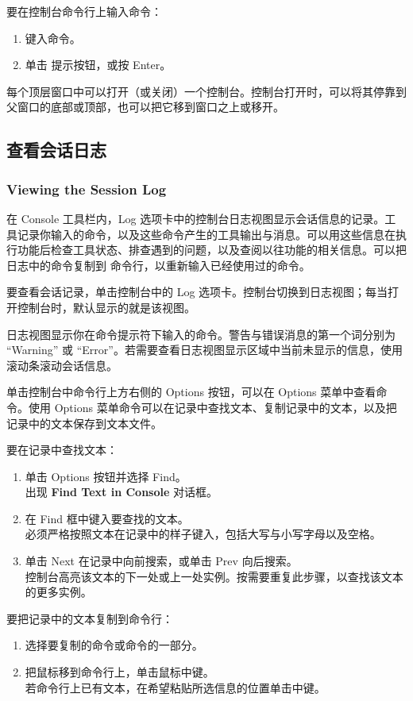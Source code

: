 要在控制台命令行上输入命令：
\begin{enumerate}
  \item 键入命令。
  \item 单击  提示按钮，或按 Enter。
\end{enumerate}

每个顶层窗口中可以打开（或关闭）一个控制台。控制台打开时，可以将其停靠到父窗口的底部或顶部，也可以把它移到窗口之上或移开。

\subsection{查看会话日志}
\subsubsection*{Viewing the Session Log}

在 Console 工具栏内，Log 选项卡中的控制台日志视图显示会话信息的记录。工具记录你输入的命令，以及这些命令产生的工具输出与消息。可以用这些信息在执行功能后检查工具状态、排查遇到的问题，以及查阅以往功能的相关信息。可以把日志中的命令复制到  命令行，以重新输入已经使用过的命令。

要查看会话记录，单击控制台中的 Log 选项卡。控制台切换到日志视图；每当打开控制台时，默认显示的就是该视图。

日志视图显示你在命令提示符下输入的命令。警告与错误消息的第一个词分别为 “Warning” 或 “Error”。若需要查看日志视图显示区域中当前未显示的信息，使用滚动条滚动会话信息。

单击控制台中命令行上方右侧的 Options 按钮，可以在 Options 菜单中查看命令。使用 Options 菜单命令可以在记录中查找文本、复制记录中的文本，以及把记录中的文本保存到文本文件。

要在记录中查找文本：
\begin{enumerate}
  \item 单击 Options 按钮并选择 Find。\\
        出现 \textbf{Find Text in Console} 对话框。
  \item 在 Find 框中键入要查找的文本。\\
        必须严格按照文本在记录中的样子键入，包括大写与小写字母以及空格。
  \item 单击 Next 在记录中向前搜索，或单击 Prev 向后搜索。\\
        控制台高亮该文本的下一处或上一处实例。按需要重复此步骤，以查找该文本的更多实例。
\end{enumerate}

要把记录中的文本复制到命令行：
\begin{enumerate}
  \item 选择要复制的命令或命令的一部分。
  \item 把鼠标移到命令行上，单击鼠标中键。\\
        若命令行上已有文本，在希望粘贴所选信息的位置单击中键。
\end{enumerate}

